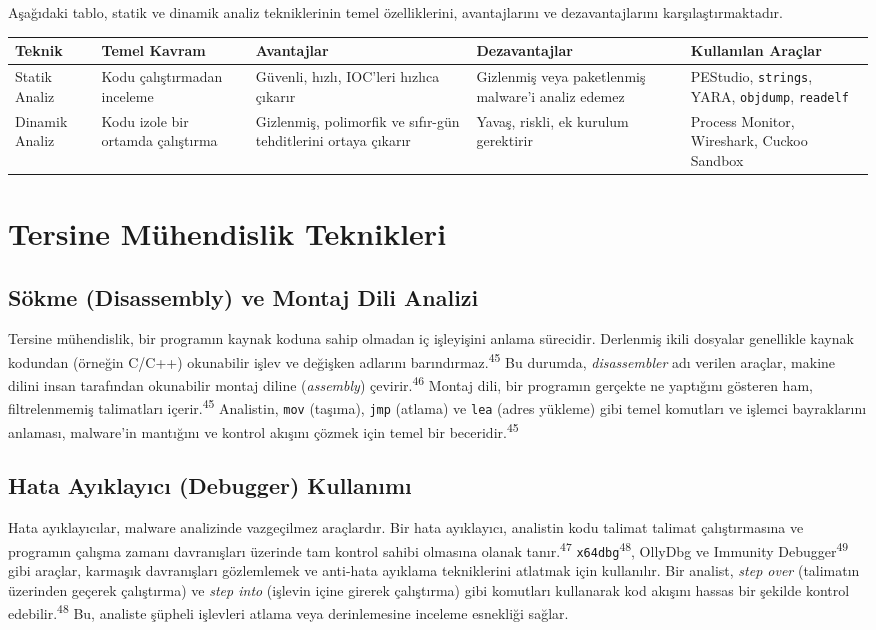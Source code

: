 Aşağıdaki tablo, statik ve dinamik analiz tekniklerinin temel özelliklerini, avantajlarını ve dezavantajlarını karşılaştırmaktadır.

\begin{longtable}{|l|p{3.5cm}|p{4cm}|p{4cm}|p{3.5cm}|}
\hline
\textbf{Teknik} & \textbf{Temel Kavram} & \textbf{Avantajlar} & \textbf{Dezavantajlar} & \textbf{Kullanılan Araçlar} \\
\hline
Statik Analiz & Kodu çalıştırmadan inceleme & Güvenli, hızlı, IOC'leri hızlıca çıkarır & Gizlenmiş veya paketlenmiş malware'i analiz edemez & PEStudio, \texttt{strings}, YARA, \texttt{objdump}, \texttt{readelf} \\
\hline
Dinamik Analiz & Kodu izole bir ortamda çalıştırma & Gizlenmiş, polimorfik ve sıfır-gün tehditlerini ortaya çıkarır & Yavaş, riskli, ek kurulum gerektirir & Process Monitor, Wireshark, Cuckoo Sandbox \\
\hline
\end{longtable}

\section{Tersine Mühendislik Teknikleri}

\subsection{Sökme (Disassembly) ve Montaj Dili Analizi}

Tersine mühendislik, bir programın kaynak koduna sahip olmadan iç işleyişini anlama sürecidir. Derlenmiş ikili dosyalar genellikle kaynak kodundan (örneğin C/C++) okunabilir işlev ve değişken adlarını barındırmaz.\textsuperscript{45} Bu durumda, \textit{disassembler} adı verilen araçlar, makine dilini insan tarafından okunabilir montaj diline (\textit{assembly}) çevirir.\textsuperscript{46} Montaj dili, bir programın gerçekte ne yaptığını gösteren ham, filtrelenmemiş talimatları içerir.\textsuperscript{45} Analistin, \texttt{mov} (taşıma), \texttt{jmp} (atlama) ve \texttt{lea} (adres yükleme) gibi temel komutları ve işlemci bayraklarını anlaması, malware'in mantığını ve kontrol akışını çözmek için temel bir beceridir.\textsuperscript{45}

\subsection{Hata Ayıklayıcı (Debugger) Kullanımı}

Hata ayıklayıcılar, malware analizinde vazgeçilmez araçlardır. Bir hata ayıklayıcı, analistin kodu talimat talimat çalıştırmasına ve programın çalışma zamanı davranışları üzerinde tam kontrol sahibi olmasına olanak tanır.\textsuperscript{47} \texttt{x64dbg}\textsuperscript{48}, OllyDbg ve Immunity Debugger\textsuperscript{49} gibi araçlar, karmaşık davranışları gözlemlemek ve anti-hata ayıklama tekniklerini atlatmak için kullanılır. Bir analist, \textit{step over} (talimatın üzerinden geçerek çalıştırma) ve \textit{step into} (işlevin içine girerek çalıştırma) gibi komutları kullanarak kod akışını hassas bir şekilde kontrol edebilir.\textsuperscript{48} Bu, analiste şüpheli işlevleri atlama veya derinlemesine inceleme esnekliği sağlar.

